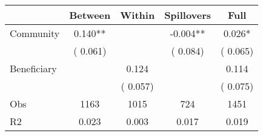 
\begin{tabular}{l*{4}{c}}\hline&\multicolumn{1}{c}{Between}&\multicolumn{1}{c}{Within}&\multicolumn{1}{c}{Spillovers}&\multicolumn{1}{c}{Full}\\ \hline
 Community             &              0.140**      &                                               &       -0.004** &         0.026*                            \\ 
                               &        (       0.061)           &                                       &       (       0.084)     &      (       0.065)                                           \\ 
 Beneficiary   &                                               &        0.124    &                                &             0.114                            \\ 
                               &                                               & (       0.057)                  &                                        &      (       0.075)                                           \\ 
\hline                                                                                                                                                                                                                                            
 Obs                   &               1163               &       1015                       &       724                &              1451                                               \\ 
 R2                    &                      0.023              &              0.003                      &              0.017               &                     0.019                                              \\ 
\hline \end{tabular}                                                                                                                                                                                                              